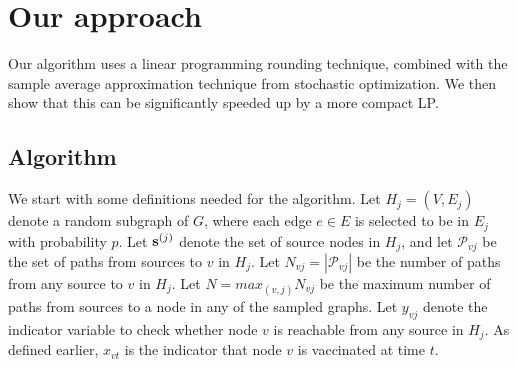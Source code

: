 
\section{Our approach}
\label{sec:method}

Our algorithm \algo{} uses a linear programming rounding technique, combined with the sample average approximation
technique from stochastic optimization. We then show that this can be significantly speeded up by a more compact LP.

\subsection{Algorithm \algo{}}

We start with some definitions needed for the algorithm. Let $H_j=(V, E_j)$ denote a random subgraph of $G$,
where each edge $e\in E$ is selected to be in $E_j$ with probability $p$. 
Let $\mathbf{s}^{(j)}$ denote the set of source nodes in $H_j$, and
let $\mathcal{P}_{vj}$ be the set of paths from sources to $v$ in $H_j$. 
Let $N_{vj} = |\mathcal{P}_{vj}|$ be the number of paths from any source to $v$ in $H_j$. 
Let $N = max_{(v,j)}  N_{vj}$ be the maximum number of paths from sources to a node in any of the sampled
graphs. Let $y_{vj}$ denote the indicator variable to check whether node $v$ is reachable from any source in $H_j$.
As defined earlier, $x_{vt}$ is the indicator that node $v$ is vaccinated at time $t$.

